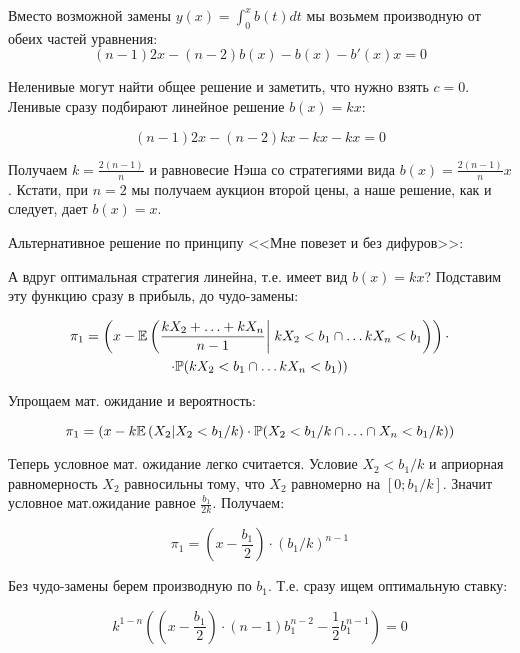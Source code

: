 \begin{enumerate}
Вместо возможной замены $ y(x)=\int_{0}^{x}b(t)dt $ мы возьмем производную от обеих частей уравнения:
\begin{equation}
(n-1)2x-(n-2)b(x)-b(x)-b'(x)x=0
\end{equation}

Неленивые могут найти общее решение и заметить, что нужно взять $ c=0 $. Ленивые сразу подбирают линейное решение $ b(x)=kx $:

\begin{equation}
(n-1)2x-(n-2)kx-kx-kx=0
\end{equation}

Получаем $ k=\frac{2(n-1)}{n} $ и равновесие Нэша со стратегиями вида $ b(x)=\frac{2(n-1)}{n}x $. Кстати, при $ n=2 $ мы получаем аукцион второй цены, а наше решение, как и следует, дает $ b(x)=x $.

Альтернативное решение по принципу <<Мне повезет и без дифуров>>:

А вдруг оптимальная стратегия линейна, т.е. имеет вид $ b(x)=kx $? Подставим эту функцию сразу в прибыль, до чудо-замены:

\begin{multline}
\pi_{1}=\left(x-\E\left(\frac{kX_{2}+\ldots+kX_{n}}{n-1}\right|\left.\vphantom{\frac{kX_{2}+\ldots+kX_{n}}{n-1}}kX_{2}<b_{1}\cap \ldots kX_{n}<b_{1}\right)\right)\cdot \\
\cdot \P(kX_{2}<b_{1}\cap \ldots kX_{n}<b_{1}))
\end{multline}

Упрощаем мат. ожидание и вероятность:

\begin{equation}
\pi_{1}=(x-k\mathbb{E}\left(X_{2}|X_{2}<b_{1}/k\right)\cdot \mathbb{P}(X_{2}<b_{1}/k\cap \ldots \cap X_{n}<b_{1}/k))
\end{equation}

Теперь условное мат. ожидание легко считается. Условие $ X_{2}<b_{1}/k $ и априорная равномерность $ X_{2} $ равносильны тому, что $ X_{2} $ равномерно на $ [0;b_{1}/k] $. Значит условное мат.ожидание равное $ \frac{b_{1}}{2k} $. Получаем:

\begin{equation}
\pi_{1}=\left( x-\frac{b_{1}}{2}\right)\cdot (b_{1}/k)^{n-1}
\end{equation}

Без чудо-замены берем производную по $ b_{1} $. Т.е. сразу ищем оптимальную ставку:

\begin{equation}
k^{1-n}\left( \left( x-\frac{b_{1}}{2} \right)\cdot (n-1)b_{1}^{n-2}-\frac{1}{2}b_{1}^{n-1} \right)=0
\end{equation}


\end{enumerate}

